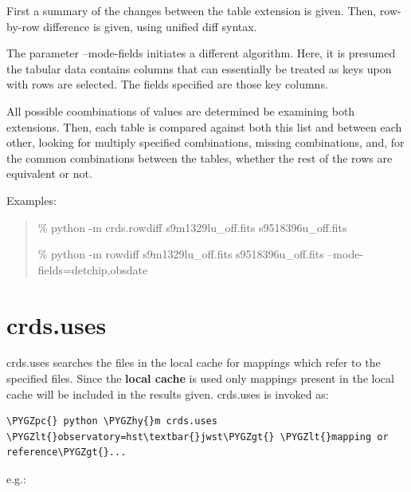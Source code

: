 \documentclass[letterpaper,10pt,english]{sphinxmanual}
\def\PYGZlt{\char`\<}
\def\PYGZgt{\char`\>}
\def\PYGZpc{\char`\%}
\def\PYGZhy{\char`\-}
\begin{document}
First a summary of the changes between the table extension is given.
Then, row-by-row difference is given, using unified diff syntax.

The parameter --mode-fields initiates a different algorithm.
Here, it is presumed the tabular data contains columns that can essentially
be treated as keys upon with rows are selected. The fields specified are those
key columns.

All possible coombinations of values are determined be examining both
extensions. Then, each table is compared against both this list and between
each other, looking for multiply specified combinations, missing combinations,
and, for the common combinations between the tables, whether the rest of the
rows are equivalent or not.

Examples:
\begin{quote}

\% python -m crds.rowdiff s9m1329lu\_off.fits s9518396u\_off.fits

\% python -m rowdiff s9m1329lu\_off.fits s9518396u\_off.fits --mode-fields=detchip,obsdate
\end{quote}


\section{crds.uses}
\label{command_line_tools:crds-uses}
crds.uses searches the files in the local cache for mappings which refer to the
specified files.  Since the \textbf{local cache} is used only mappings present in the
local cache will be included in the results given.  crds.uses is invoked as:

\begin{Verbatim}[commandchars=\\\{\}]
\PYGZpc{} python \PYGZhy{}m crds.uses \PYGZlt{}observatory=hst\textbar{}jwst\PYGZgt{} \PYGZlt{}mapping or reference\PYGZgt{}...
\end{Verbatim}

e.g.:
\end{document}
